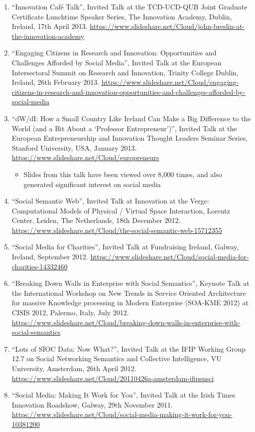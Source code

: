 \documentclass[10pt,a4paper]{res} %
\begin{document}
\begin{resume}
\begin{enumerate}
\item ``Innovation Caf\'{e} Talk'', Invited Talk at the TCD-UCD-QUB Joint Graduate Certificate Lunchtime Speaker Series, The Innovation Academy, Dublin, Ireland, 17th April 2013. \url{https://www.slideshare.net/Cloud/john-breslin-at-the-innovation-academy}
\item ``Engaging Citizens in Research and Innovation: Opportunities and Challenges Afforded by Social Media'', Invited Talk at the European Intersectoral Summit on Research and Innovation, Trinity College Dublin, Ireland, 26th February 2013. \url{https://www.slideshare.net/Cloud/engaging-citizens-in-research-and-innovation-opportunities-and-challenges-afforded-by-social-media}
\item ``dW/dI: How a Small Country Like Ireland Can Make a Big Difference to the World (and a Bit About a `Professor Entrepreneur')'', Invited Talk at the European Entrepreneurship and Innovation Thought Leaders Seminar Series, Stanford University, USA, January 2013. \url{https://www.slideshare.net/Cloud/europreneurs}
\begin{itemize} \itemsep -2pt
\item Slides from this talk have been viewed over 8,000 times, and also generated significant interest on social media
\end{itemize}
\item ``Social Semantic Web'', Invited Talk at Innovation at the Verge: Computational Models of Physical / Virtual Space Interaction, Lorentz Center, Leiden, The Netherlands, 18th December 2012. \url{https://www.slideshare.net/Cloud/the-social-semantic-web-15712355}
\item ``Social Media for Charities'', Invited Talk at Fundraising Ireland, Galway, Ireland, September 2012. \url{https://www.slideshare.net/Cloud/social-media-for-charities-14332460}
\item ``Breaking Down Walls in Enterprise with Social Semantics'', Keynote Talk at the International Workshop on New Trends in Service Oriented Architecture for massive Knowledge processing in Modern Enterprise (SOA-KME 2012) at CISIS 2012, Palermo, Italy, July 2012. \url{https://www.slideshare.net/Cloud/breaking-down-walls-in-enterprise-with-social-semantics}
\item ``Lots of SIOC Data: Now What?'', Invited Talk at the IFIP Working Group 12.7 on Social Networking Semantics and Collective Intelligence, VU University, Amsterdam, 26th April 2012. \url{https://www.slideshare.net/Cloud/20110426a-amsterdam-ifipsnsci}
\item ``Social Media: Making It Work for You'', Invited Talk at the Irish Times Innovation Roadshow, Galway, 29th November 2011. \url{https://www.slideshare.net/Cloud/social-media-making-it-work-for-you-10381200}

\end{enumerate}
\end{resume}
\end{document}
